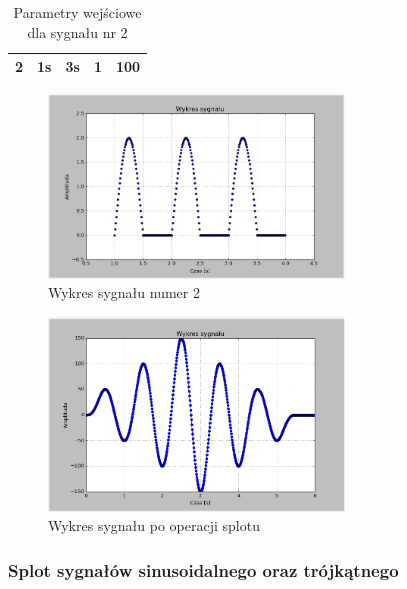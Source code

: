 \documentclass{article}
\begin{document}
{{\begin{table}[h!]
\begin{tabular}{|l|l|l|l|l|}
                    2 & 1s & 3s & 1 & 100           \\ \hline
                \end{tabular}
                \caption{Parametry wejściowe dla sygnału nr 2}
            \end{table}
            \begin{figure}[h!]
                \centering
                \includegraphics[width=0.7\textwidth]{img/splot4.png}
                \caption{Wykres sygnału numer 2}
            \end{figure}

            \begin{figure}[h!]
                \centering
                \includegraphics[width=0.7\textwidth]{img/splot5.png}
                \caption{Wykres sygnału po operacji splotu}
            \end{figure}
            \FloatBarrier
        }

        \subsubsection{Splot sygnałów sinusoidalnego oraz trójkątnego} \label{eksperyment:splot3}{

}}
\end{document}
